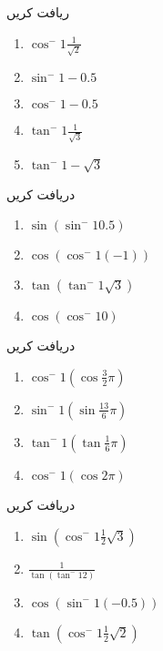 ریافت کریں\\
\begin{enumerate}
\item
\(\cos^-1 \frac{1}{\sqrt{2}}\)
\item
\(\sin^-1 -0.5\)
\item
\(\cos^-1 -0.5 \)
\item
\(\tan^-1 \frac{1}{\sqrt{3}}\)
\item
\(\tan^-1 -\sqrt{3}\)
\end{enumerate}
دریافت کریں\\
\begin{enumerate}
\item \(\sin(\sin^-1 0.5)\)
\item \(\cos(\cos^-1 (-1))\)
\item \(\tan(\tan^-1\sqrt{3}) \)
\item \(\cos( \cos^-1 0)\)
\end{enumerate}
دریافت کریں\\
\begin{enumerate}
\item
\(\cos^-1(\cos \frac{3}{2}\pi)\)
\item
\(\sin^-1(\sin\frac{13}{6}\pi)\)
\item
\(\tan^-1(\tan \frac{1}{6}\pi) \)
\item
\(\cos^-1(\cos 2\pi)\)
\end{enumerate}
دریافت کریں\\
\begin{enumerate}
\item \(\sin(\cos^-1 \frac{1}{2}\sqrt{3})\)
\item \(\frac{1}{\tan(\tan^-1 2)}\)
\item \(\cos(\sin^-1 (-0.5)) \)
\item\(\tan(\cos^-1\frac{1}{2}\sqrt{2})\)
\end{enumerate}


